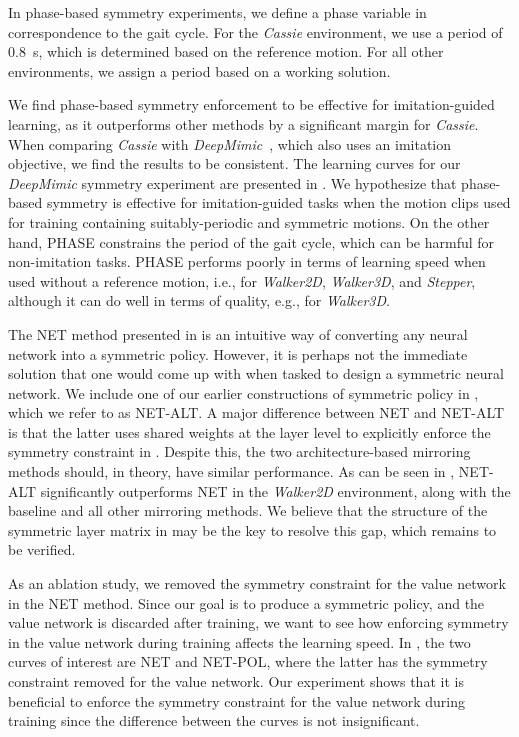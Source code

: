   In phase-based symmetry experiments, 
we define a phase variable in correspondence to the gait cycle.  
For the \textit{Cassie} environment, we use a period of 0.8~s, 
which is determined based on the reference motion.  
For all other environments, we assign a period based on a working solution.

We find phase-based symmetry enforcement to be effective for imitation-guided learning, 
as it outperforms other methods by a significant margin for \textit{Cassie}.  
When comparing \textit{Cassie} with \textit{DeepMimic}~\cite{2018-TOG-deepMimic}, 
which also uses an imitation objective, we find the results to be consistent.  
The learning curves for our \textit{DeepMimic} symmetry experiment are presented in .  
We hypothesize that phase-based symmetry is effective for imitation-guided tasks when
the motion clips used for training containing suitably-periodic and symmetric motions.  
On the other hand, PHASE constrains the period of the gait cycle, 
which can be harmful for non-imitation tasks. 
PHASE performs poorly in terms of learning speed 
when used without a reference motion, i.e., 
for \textit{Walker2D}, \textit{Walker3D}, and \textit{Stepper}, although
it can do well in terms of quality, e.g., for \textit{Walker3D}.

  The NET method presented in  is 
an intuitive way of converting any neural network into a symmetric policy.  
However, it is perhaps not the immediate solution that one would come up with when tasked to design a symmetric neural network.  
We include one of our earlier constructions of symmetric policy in , 
which we refer to as NET-ALT.  A major difference between NET and NET-ALT is that the latter uses 
shared weights at the layer level to explicitly enforce the symmetry constraint in .  
Despite this, the two architecture-based mirroring methods should, in theory, have similar performance.  
As can be seen in , NET-ALT significantly outperforms NET in the \textit{Walker2D} environment, 
along with the baseline and all other mirroring methods.  
We believe that the structure of the symmetric layer matrix in  
may be the key to resolve this gap, which remains to be verified.

  As an ablation study, we removed the symmetry constraint 
for the value network in the NET method.  Since our goal is to produce a symmetric policy, 
and the value network is discarded after training, we want to see how enforcing symmetry in the value network 
during training affects the learning speed.  In , the two curves of interest are 
NET and NET-POL, where the latter has the symmetry constraint removed for the value network.  
Our experiment shows that it is beneficial to enforce the symmetry constraint for the value network during training
since the difference between the curves is not insignificant.  

